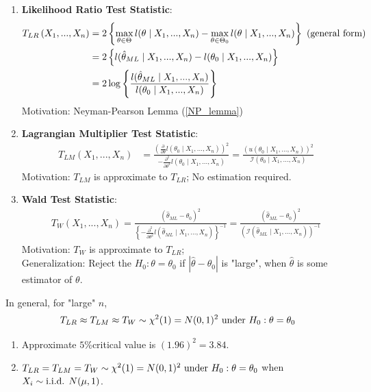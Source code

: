 \documentclass[11pt]{elegantbook}
\begin{document}
\begin{enumerate}[$\bullet$]
    \item \textbf{Likelihood Ratio Test Statistic}:
    \begin{equation}
        \begin{aligned}
            T_{LR}\left(X_1,...,X_n\right)&=2\left\{\max_{\theta\in\Theta}l(\theta\mid X_1,...,X_n)-\max_{\theta\in\Theta_0}l(\theta\mid X_1,...,X_n)\right\} \textnormal{ (general form)}\\
            &=2\left\{l(\hat{\theta}_{ML}\mid X_1,...,X_n)-l(\theta_0\mid X_1,...,X_n)\right\}\\
            &=2\log\left\{\frac{l(\hat{\theta}_{ML}\mid X_1,...,X_n)}{l(\theta_0\mid X_1,...,X_n)}\right\}
        \end{aligned}
        \nonumber
    \end{equation}
    Motivation: Neyman-Pearson Lemma (\ref{NP_lemma})
    \item \textbf{Lagrangian Multiplier Test Statistic}:
    \begin{equation}
        \begin{aligned}
            T_{LM}\left(X_1,...,X_n\right)&=\frac{\left(\frac{\partial}{\partial \theta}l(\theta_0\mid X_1,...,X_n)\right)^2}{-\frac{\partial^2}{\partial \theta^2}l(\theta_0\mid X_1,...,X_n)}=\frac{\left(u(\theta_0\mid X_1,...,X_n)\right)^2}{\mathcal{I}(\theta_0\mid X_1,...,X_n)}
        \end{aligned}
        \nonumber
    \end{equation}
    Motivation: $T_{LM}$ is approximate to $T_{LR}$; No estimation required.
    \item \textbf{Wald Test Statistic}:
    \begin{equation}
        \begin{aligned}
            T_W\left(X_1,...,X_n\right)=\frac{(\hat{\theta}_{ML}-\theta_0)^2}{\left\{-\frac{\partial^2}{\partial \theta^2}l(\hat{\theta}_{ML}\mid X_1,...,X_n)\right\}^{-1}}=\frac{(\hat{\theta}_{ML}-\theta_0)^2}{\left(\mathcal{I}(\hat{\theta}_{ML}\mid X_1,...,X_n)\right)^{-1}}
        \end{aligned}
        \nonumber
    \end{equation}
    Motivation: $T_W$ is approximate to $T_{LR}$;\\
    Generalization: Reject the $H_0:\theta=\theta_0$ if $|\hat{\theta}-\theta_0|$ is "large", when $\hat{\theta}$ is some estimator of $\theta$.
\end{enumerate}
\begin{claim}
    In general, for "large" $n$, $$T_{LR}\approx T_{LM}\approx T_W\sim \chi^2(1)=N(0,1)^2 \textnormal{ under }H_0:\theta=\theta_0$$
    \begin{enumerate}[$\circ$]
        \item Approximate $5\%$critical value is $(1.96)^2=3.84$.
        \item $T_{LR}=T_{LM}=T_W\sim \chi^2(1)=N(0,1)^2 \textnormal{ under }H_0:\theta=\theta_0$ when $X_i\sim \textnormal{i.i.d. }N(\mu,1)$.
    \end{enumerate}
\end{claim}
\end{document}
